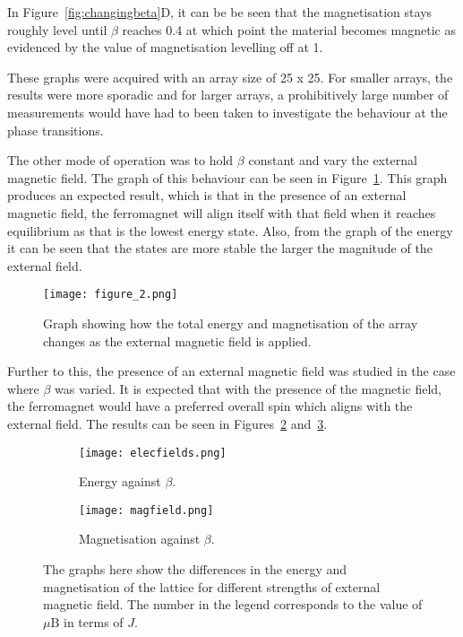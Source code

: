 \documentclass[11pt]{article}
\newcommand{\mathbold}[1]{\boldsymbol{\mathrm{#1}}}
\begin{document}
In Figure~\ref{fig:changingbeta}D, it can be be seen that the magnetisation stays roughly level until $\beta$ reaches 0.4 at which point the material becomes magnetic as evidenced by the value of magnetisation levelling off at 1.

These graphs were acquired with an array size of 25 x 25. For smaller arrays, the results were more sporadic and for larger arrays, a prohibitively large number of measurements would have had to been taken to investigate the behaviour at the phase transitions.

The other mode of operation was to hold $\beta$ constant and vary the external magnetic field. The graph of this behaviour can be seen in Figure~\ref{fig:changingfield}. This graph produces an expected result, which is that in the presence of an external magnetic field, the ferromagnet will align itself with that field when it reaches equilibrium as that is the lowest energy state. Also, from the graph of the energy it can be seen that the states are more stable the larger the magnitude of the external field.

\begin{figure}[!ht]
\centering
\texttt{[image: figure\_2.png]}
\caption{Graph showing how the total energy and magnetisation of the array changes as the external magnetic field is applied.}
\label{fig:changingfield}
\end{figure}

Further to this, the presence of an external magnetic field was studied in the case where $\beta$ was varied. It is expected that with the presence of the magnetic field, the ferromagnet would have a preferred overall spin which aligns with the external field. The results can be seen in Figures~\ref{fig:energyfieldchange} and~\ref{fig:magnetisationfieldchange}.

\begin{figure}[!ht]
\centering
\begin{subfigure}[b]{0.49\textwidth}
\texttt{[image: elecfields.png]}
\caption{Energy against $\beta$.}
\label{fig:energyfieldchange}
\end{subfigure}
\begin{subfigure}[b]{0.49\textwidth}
\texttt{[image: magfield.png]}
\caption{Magnetisation against $\beta$.}
\label{fig:magnetisationfieldchange}
\end{subfigure}
\caption{The graphs here show the differences in the energy and magnetisation of the lattice for different strengths of external magnetic field. The number in the legend corresponds to the value of $\mu \mathbold{B}$ in terms of $J$.}
\label{fig:multiplefield}
\end{figure}
\end{document}

